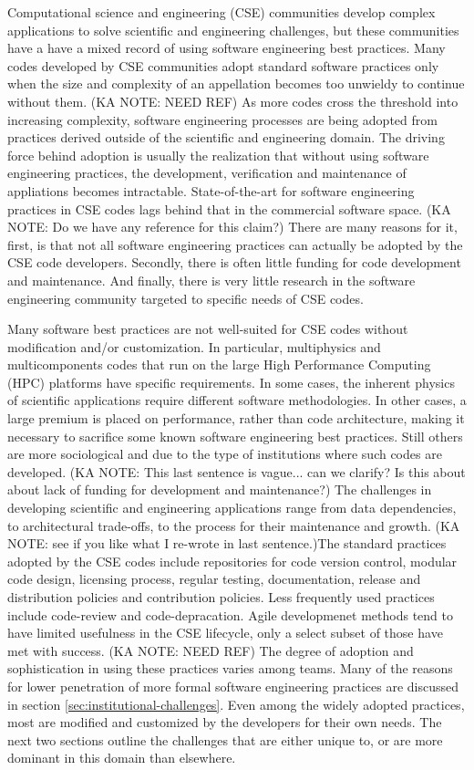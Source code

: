 \label{sec:introduction}
Computational science and engineering (CSE) communities develop complex applications to solve scientific and engineering challenges, but these communities have a have a mixed record of using software engineering best
practices. Many codes developed by CSE communities adopt standard software practices only when the size and complexity of an appellation becomes too unwieldy to continue without them.  (KA NOTE: NEED REF) 
As more codes cross the threshold into increasing complexity, software engineering processes are being adopted from practices derived outside of the scientific and engineering domain.  The driving force behind adoption is usually the realization
that without using software engineering practices, the development,
verification and maintenance of appliations becomes
intractable. State-of-the-art for software engineering
practices in CSE codes lags behind that in the commercial software
space. (KA NOTE: Do we have any reference for this claim?) There are many reasons for it, first, is that
not all software engineering practices can actually be adopted by the CSE code
developers.  Secondly, there is often little funding for code development and maintenance. And finally, there is very little research in the software
engineering community targeted to specific needs of CSE codes.

Many software best practices are not well-suited for CSE codes without
modification and/or customization.  In particular, multiphysics and 
multicomponents codes that run on the large High Performance Computing (HPC) platforms have specific requirements.  In some cases,
the inherent physics of scientific applications require different
software methodologies.  In other cases, a large premium is placed on
performance, rather than code architecture, making it necessary to sacrifice some known software engineering best practices.  Still others are more
sociological and due to the type of institutions where such codes are
developed.  (KA NOTE: This last sentence is vague...  can we clarify? Is this about about lack of funding for development and maintenance?)  
The challenges in developing scientific and engineering applications range
from data dependencies, to architectural trade-offs, to the process for their maintenance and
growth.  (KA NOTE: see if you like what I re-wrote in last sentence.)The standard practices adopted by the CSE codes include
repositories for code version control, modular code design, licensing
process, regular testing, documentation, release and distribution
policies and contribution policies. Less frequently used practices
include code-review and code-depracation. Agile developmenet methods
tend to have limited usefulness in the CSE lifecycle, only a
select subset of those have met with success.  (KA NOTE: NEED REF) The degree of adoption and
sophistication in using these practices varies among teams. Many of
the reasons for lower penetration of more formal software engineering practices are discussed in section
\ref{sec:institutional-challenges}. Even among the widely adopted
practices, most are modified and customized by the developers for
their own needs. The next two sections outline the challenges that
are either unique to, or are more dominant in this domain than
elsewhere.  


